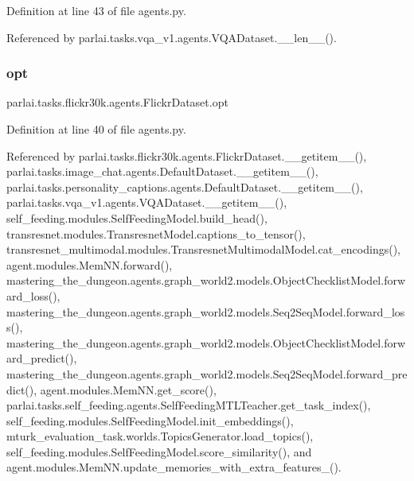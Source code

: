Definition at line 43 of file agents.\+py.



Referenced by parlai.\+tasks.\+vqa\+\_\+v1.\+agents.\+V\+Q\+A\+Dataset.\+\_\+\+\_\+len\+\_\+\+\_\+().

\mbox{\label{classparlai_1_1tasks_1_1flickr30k_1_1agents_1_1FlickrDataset_a0c37a007795dcd51a466d3420a3a1302}} 
\subsubsection{\texorpdfstring{opt}{opt}}
{\footnotesize\ttfamily parlai.\+tasks.\+flickr30k.\+agents.\+Flickr\+Dataset.\+opt}



Definition at line 40 of file agents.\+py.



Referenced by parlai.\+tasks.\+flickr30k.\+agents.\+Flickr\+Dataset.\+\_\+\+\_\+getitem\+\_\+\+\_\+(), parlai.\+tasks.\+image\+\_\+chat.\+agents.\+Default\+Dataset.\+\_\+\+\_\+getitem\+\_\+\+\_\+(), parlai.\+tasks.\+personality\+\_\+captions.\+agents.\+Default\+Dataset.\+\_\+\+\_\+getitem\+\_\+\+\_\+(), parlai.\+tasks.\+vqa\+\_\+v1.\+agents.\+V\+Q\+A\+Dataset.\+\_\+\+\_\+getitem\+\_\+\+\_\+(), self\+\_\+feeding.\+modules.\+Self\+Feeding\+Model.\+build\+\_\+head(), transresnet.\+modules.\+Transresnet\+Model.\+captions\+\_\+to\+\_\+tensor(), transresnet\+\_\+multimodal.\+modules.\+Transresnet\+Multimodal\+Model.\+cat\+\_\+encodings(), agent.\+modules.\+Mem\+N\+N.\+forward(), mastering\+\_\+the\+\_\+dungeon.\+agents.\+graph\+\_\+world2.\+models.\+Object\+Checklist\+Model.\+forward\+\_\+loss(), mastering\+\_\+the\+\_\+dungeon.\+agents.\+graph\+\_\+world2.\+models.\+Seq2\+Seq\+Model.\+forward\+\_\+loss(), mastering\+\_\+the\+\_\+dungeon.\+agents.\+graph\+\_\+world2.\+models.\+Object\+Checklist\+Model.\+forward\+\_\+predict(), mastering\+\_\+the\+\_\+dungeon.\+agents.\+graph\+\_\+world2.\+models.\+Seq2\+Seq\+Model.\+forward\+\_\+predict(), agent.\+modules.\+Mem\+N\+N.\+get\+\_\+score(), parlai.\+tasks.\+self\+\_\+feeding.\+agents.\+Self\+Feeding\+M\+T\+L\+Teacher.\+get\+\_\+task\+\_\+index(), self\+\_\+feeding.\+modules.\+Self\+Feeding\+Model.\+init\+\_\+embeddings(), mturk\+\_\+evaluation\+\_\+task.\+worlds.\+Topics\+Generator.\+load\+\_\+topics(), self\+\_\+feeding.\+modules.\+Self\+Feeding\+Model.\+score\+\_\+similarity(), and agent.\+modules.\+Mem\+N\+N.\+update\+\_\+memories\+\_\+with\+\_\+extra\+\_\+features\+\_\+().

